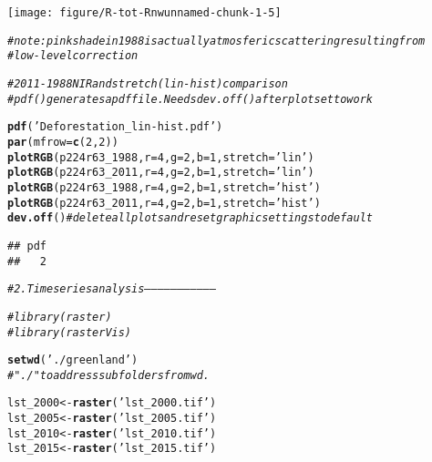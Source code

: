 \documentclass{article}\usepackage[]{graphicx}\usepackage[]{color}
\makeatletter
\newcommand{\hlnum}[1]{\textcolor[rgb]{0.686,0.059,0.569}{#1}}%
\newcommand{\hlstr}[1]{\textcolor[rgb]{0.192,0.494,0.8}{#1}}%
\newcommand{\hlcom}[1]{\textcolor[rgb]{0.678,0.584,0.686}{\textit{#1}}}%
\newcommand{\hlstd}[1]{\textcolor[rgb]{0.345,0.345,0.345}{#1}}%
\newcommand{\hlkwb}[1]{\textcolor[rgb]{0.69,0.353,0.396}{#1}}%
\newcommand{\hlkwc}[1]{\textcolor[rgb]{0.333,0.667,0.333}{#1}}%
\newcommand{\hlkwd}[1]{\textcolor[rgb]{0.737,0.353,0.396}{\textbf{#1}}}%
\newenvironment{kframe}{%
 \def\at@end@of@kframe{}%
 \ifinner\ifhmode%
  \def\at@end@of@kframe{\end{minipage}}%
  \begin{minipage}{\columnwidth}%
 \fi\fi%
 \def\FrameCommand##1{\hskip\@totalleftmargin \hskip-\fboxsep
 \colorbox{shadecolor}{##1}\hskip-\fboxsep
     \hskip-\linewidth \hskip-\@totalleftmargin \hskip\columnwidth}%
 \MakeFramed {\advance\hsize-\width
   \@totalleftmargin\z@ \linewidth\hsize
   \@setminipage}}%
 {\par\unskip\endMakeFramed%
 \at@end@of@kframe}
\newenvironment{knitrout}{}{} %
\makeatother
\begin{document}
\begin{knitrout}
{\centering \texttt{[image: figure/R-tot-Rnwunnamed-chunk-1-5]} 

}


\begin{kframe}\begin{alltt}
\hlcom{# note: pink shade in 1988 is actually atmosferic scattering resulting from}
\hlcom{# low-level correction}

\hlcom{# 2011-1988 NIR and stretch (lin - hist) comparison}
\hlcom{# pdf() generates a pdf file. Needs dev.off() after plot set to work}

\hlkwd{pdf}\hlstd{(}\hlstr{'Deforestation_lin-hist.pdf'}\hlstd{)}
\hlkwd{par}\hlstd{(}\hlkwc{mfrow} \hlstd{=} \hlkwd{c}\hlstd{(}\hlnum{2}\hlstd{,} \hlnum{2}\hlstd{))}
\hlkwd{plotRGB}\hlstd{(p224r63_1988,} \hlkwc{r} \hlstd{=} \hlnum{4}\hlstd{,} \hlkwc{g} \hlstd{=} \hlnum{2}\hlstd{,} \hlkwc{b} \hlstd{=} \hlnum{1}\hlstd{,} \hlkwc{stretch} \hlstd{=} \hlstr{'lin'}\hlstd{)}
\hlkwd{plotRGB}\hlstd{(p224r63_2011,} \hlkwc{r} \hlstd{=} \hlnum{4}\hlstd{,} \hlkwc{g} \hlstd{=} \hlnum{2}\hlstd{,} \hlkwc{b} \hlstd{=} \hlnum{1}\hlstd{,} \hlkwc{stretch} \hlstd{=} \hlstr{'lin'}\hlstd{)}
\hlkwd{plotRGB}\hlstd{(p224r63_1988,} \hlkwc{r} \hlstd{=} \hlnum{4}\hlstd{,} \hlkwc{g} \hlstd{=} \hlnum{2}\hlstd{,} \hlkwc{b} \hlstd{=} \hlnum{1}\hlstd{,} \hlkwc{stretch} \hlstd{=} \hlstr{'hist'}\hlstd{)}
\hlkwd{plotRGB}\hlstd{(p224r63_2011,} \hlkwc{r} \hlstd{=} \hlnum{4}\hlstd{,} \hlkwc{g} \hlstd{=} \hlnum{2}\hlstd{,} \hlkwc{b} \hlstd{=} \hlnum{1}\hlstd{,} \hlkwc{stretch} \hlstd{=} \hlstr{'hist'}\hlstd{)}
\hlkwd{dev.off}\hlstd{()} \hlcom{# delete all plots and reset graphic settings to default}
\end{alltt}
\begin{verbatim}
## pdf 
##   2
\end{verbatim}
\begin{alltt}
\hlcom{# 2. Time series analysis---------------------------------}

\hlcom{# library(raster)}
\hlcom{# library(rasterVis)}

\hlkwd{setwd}\hlstd{(}\hlstr{'./greenland'}\hlstd{)}
\hlcom{# "./" to address subfolders from wd.}

\hlstd{lst_2000} \hlkwb{<-} \hlkwd{raster}\hlstd{(}\hlstr{'lst_2000.tif'}\hlstd{)}
\hlstd{lst_2005} \hlkwb{<-} \hlkwd{raster}\hlstd{(}\hlstr{'lst_2005.tif'}\hlstd{)}
\hlstd{lst_2010} \hlkwb{<-} \hlkwd{raster}\hlstd{(}\hlstr{'lst_2010.tif'}\hlstd{)}
\hlstd{lst_2015} \hlkwb{<-} \hlkwd{raster}\hlstd{(}\hlstr{'lst_2015.tif'}\hlstd{)}


\end{alltt}
\end{kframe}
\end{knitrout}
\end{document}
